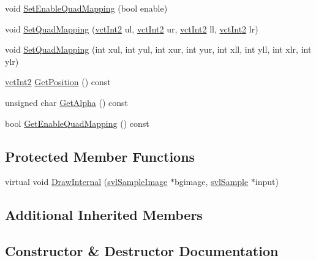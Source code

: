 \begin{DoxyCompactItemize}
void \hyperlink{classsvl_overlay_static_image_ab418d3dfffd9ea7b6dccfba21930c60a}{Set\+Enable\+Quad\+Mapping} (bool enable)
\item 
void \hyperlink{classsvl_overlay_static_image_a0fbf6fa737e9ede062d99d072d545901}{Set\+Quad\+Mapping} (\hyperlink{vct_fixed_size_vector_types_8h_add8c88eb6a432b15f14b866b9c35325f}{vct\+Int2} ul, \hyperlink{vct_fixed_size_vector_types_8h_add8c88eb6a432b15f14b866b9c35325f}{vct\+Int2} ur, \hyperlink{vct_fixed_size_vector_types_8h_add8c88eb6a432b15f14b866b9c35325f}{vct\+Int2} ll, \hyperlink{vct_fixed_size_vector_types_8h_add8c88eb6a432b15f14b866b9c35325f}{vct\+Int2} lr)
\item 
void \hyperlink{classsvl_overlay_static_image_a3c54122734f69aa9cf3a0603c9917974}{Set\+Quad\+Mapping} (int xul, int yul, int xur, int yur, int xll, int yll, int xlr, int ylr)
\item 
\hyperlink{vct_fixed_size_vector_types_8h_add8c88eb6a432b15f14b866b9c35325f}{vct\+Int2} \hyperlink{classsvl_overlay_static_image_a9d257b6689a8264fb55cc5be6fd16fa0}{Get\+Position} () const 
\item 
unsigned char \hyperlink{classsvl_overlay_static_image_a792fe4a10a725649c26429e367be6822}{Get\+Alpha} () const 
\item 
bool \hyperlink{classsvl_overlay_static_image_aba4205b55652d00ad1e2aa976509d4e6}{Get\+Enable\+Quad\+Mapping} () const 
\end{DoxyCompactItemize}
\subsection*{Protected Member Functions}
\begin{DoxyCompactItemize}
\item 
virtual void \hyperlink{classsvl_overlay_static_image_acded095ec0398a19244d48427ac95848}{Draw\+Internal} (\hyperlink{classsvl_sample_image}{svl\+Sample\+Image} $\ast$bgimage, \hyperlink{classsvl_sample}{svl\+Sample} $\ast$input)
\end{DoxyCompactItemize}
\subsection*{Additional Inherited Members}


\subsection{Constructor \& Destructor Documentation}
\hypertarget{classsvl_overlay_static_image_a16034a16d371013c7c81e1fc8fcdaf41}{}
